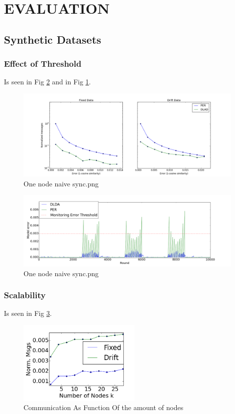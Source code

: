 \documentclass[11pt,twocolumn,varwidth=true,a4paper,fleqn]{article}
\begin{document}
\section{EVALUATION}
\subsection{Synthetic Datasets}

\subsubsection{Effect of Threshold}
Is seen in Fig \ref{PERvsDLDAoverTime} and in Fig  \ref{PERvsDLDAoverError}.
	\begin{figure}[ht]
	\centering
	\includegraphics[width=\textwidth]{PER/PERvsDLDAoverError.png}
	\caption{One node naive sync.png}
	\label{PERvsDLDAoverError}
	\end{figure}

	\begin{figure}[ht]
	\centering
	\includegraphics[width=\textwidth]{PER/PERvsDLDAoverTime.png}
	\caption{One node naive sync.png}
	\label{PERvsDLDAoverTime}
	\end{figure}
\subsubsection{Scalability}
Is seen in Fig \ref{Nodes}.
	\begin{figure}[h]
	\centering
	\includegraphics[width=60mm]{CommunicationOfFixedVsDrift/Nodes.png}
	\caption{Communication As Function Of the amount of nodes}
	\label{Nodes}
	\end{figure}
\end{document}
